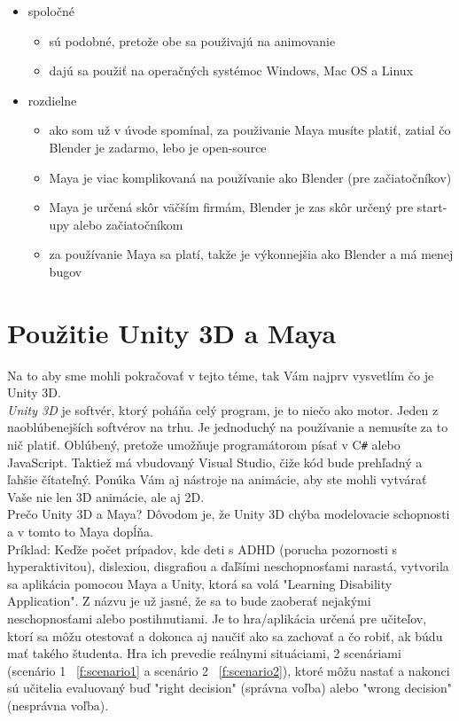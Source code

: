\documentclass[10pt,oneside,slovak,a4paper]{article}
\begin{document}
\begin{itemize}
\item spoločné
	\begin{itemize}
	\item sú podobné, pretože obe sa použivajú na animovanie
	\item dajú sa použiť na operačných systémoc Windows, Mac OS a Linux
	\end{itemize}

\item rozdielne
	\begin{itemize}
	\item ako som už v úvode spomínal, za použivanie Maya musíte platiť, zatial čo Blender je zadarmo, lebo je open-source
	\item Maya je viac komplikovaná na používanie ako Blender (pre začiatočníkov)
	\item Maya je určená skôr väčším firmám, Blender je zas skôr určený pre start-upy alebo začiatočníkom
	\item za používanie Maya sa platí, takže je výkonnejšia ako Blender a má menej bugov\cite{educba2021}
	\end{itemize}
\end{itemize}



\section{Použitie Unity 3D a Maya} \label{3d}

Na to aby sme mohli pokračovať v tejto téme, tak Vám najprv vysvetlím čo je Unity 3D.\\

\emph{Unity 3D} je softvér, ktorý poháňa celý program, je to niečo ako motor. Jeden z naoblúbenejších softvérov na trhu. Je jednoduchý na používanie a nemusíte za to nič platiť. Oblúbený, pretože umožňuje programátorom písať v C\texttt{\#} alebo JavaScript. Taktiež má vbudovaný Visual Studio, čiže kód bude prehľadný a ľahšie čítateľný. Ponúka Vám aj nástroje na animácie, aby ste mohli vytvárať Vaše nie len 3D animácie, ale aj 2D.\\

Prečo Unity 3D a Maya? Dôvodom je, že Unity 3D chýba modelovacie schopnosti a v tomto to Maya dopĺňa.\cite{labschutz2011content}\\

Príklad:
Keďže počet prípadov, kde deti s ADHD (porucha pozornosti s hyperaktivitou), dislexiou, disgrafiou a ďaľšími neschopnosťami narastá, vytvorila sa aplikácia pomocou Maya a Unity, ktorá sa volá "Learning Disability Application". Z názvu je už jasné, že sa to bude zaoberať nejakými neschopnosťami alebo postihnutiami. Je to hra/aplikácia určená pre učiteľov, ktorí sa môžu otestovať a dokonca aj naučiť ako sa zachovať a čo robiť, ak búdu mať takého študenta. Hra ich prevedie reálnymi situáciami, 2 scenáriami (scenário 1 ~\ref{f:scenario1} a scenário 2 ~\ref{f:scenario2}), ktoré môžu nastať a nakonci sú učitelia evaluovaný buď "right decision" (správna voľba) alebo "wrong decision" (nesprávna voľba)\cite{studies}.
\end{document}
